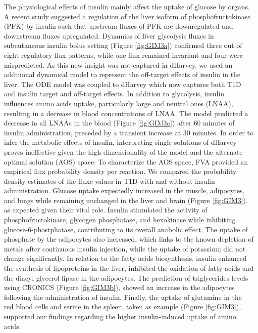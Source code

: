 The physiological effects of insulin mainly affect the uptake of glucose by organs. A recent study \cite{yugi2014reconstruction} suggested  a regulation of the liver isoform of phosphofructokinase (PFK) by insulin such that upstream fluxes of PFK are downregulated and downstream fluxes upregulated. Dynamics of liver glycolysis fluxes in subcutaneous insulin bolus setting (Figure \ref{fig:GIM3a}) confirmed three out of eight regulatory flux patterns, while one flux remained invariant and four were mispredicted. As this new insight was not captured in dHarvey, we used an additional dynamical model \cite{yugi2014reconstruction} to represent the off-target effects of insulin in the liver. The ODE model was coupled to dHarvey which now captures both T1D and insulin target and off-target effects. In addition to glycolysis, insulin influences amino acids uptake, particularly large and neutral ones (LNAA), resulting in a decrease in blood concentrations of LNAA. The model predicted a decrease in all LNAAs in the blood (Figure \ref{fig:GIM3a}) after 60 minutes of insulin administration, preceded by a transient increase at 30 minutes.
In order to infer the metabolic effects of insulin, interpreting single solutions of dHarvey proves ineffective given the high dimensionality of the model and the alternate optimal solution (AOS) space. To characterize the AOS space, FVA provided an empirical flux probability density per reaction. We compared the probability density estimates of the fluxe values in T1D with and without insulin administration. Glucose uptake expectedly increased in the muscle, adipocytes, and lungs while remaining unchanged in the liver and brain (Figure \ref{fig:GIM3}), as expected given their vital role. Insulin stimulated the activity of phosphofructokinase, glycogen phosphatase, and hexokinase while inhibiting glucose-6-phostphatase, contributing to its overall anabolic effect. The uptake of phosphate by the adipocytes also increased, which links to the known depletion  of metals after continuous insulin injection, while the uptake of potassium did not change significantly. In relation to the fatty acids biosynthesis, insulin enhanced the synthesis of lipoproteins in the liver, inhibited the oxidation of fatty acids and the diacyl glycerol lipase in the adipocytes. The prediction of triglycerides levels using CRONICS (Figure \ref{fig:GIM3b}), showed an increase in the adipocytes following the administration of insulin. Finally, the uptake of glutamine in the red blood cells and serine in the spleen, taken as example (Figure \ref{fig:GIM3}), supported our findings regarding the higher insulin-induced uptake of amino acids.\\
